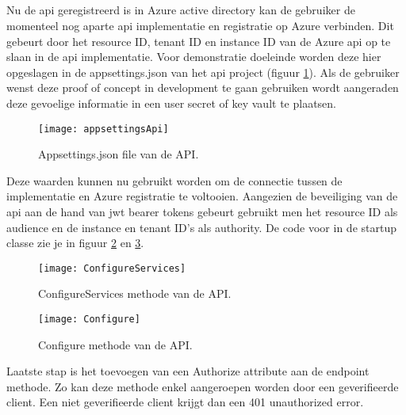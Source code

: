 \subsection{}
Nu de api geregistreerd is in Azure active directory kan de gebruiker de momenteel nog aparte api implementatie en registratie op Azure verbinden. Dit gebeurt door het resource ID, tenant ID en instance ID van de Azure api op te slaan in de api implementatie. Voor demonstratie doeleinde worden deze hier opgeslagen in de appsettings.json van het api project (figuur \ref{fig:appsetAPI}). Als de gebruiker wenst deze proof of concept in development te gaan gebruiken wordt aangeraden deze gevoelige informatie in een user secret of key vault te plaatsen.
\begin{figure}[H]
	\centering
	\texttt{[image: appsettingsApi]} 
	\caption[Appsetingsjosn]{Appsettings.json file van de API.}
	\label{fig:appsetAPI}
\end{figure}
Deze waarden kunnen nu gebruikt worden om de connectie tussen de implementatie en Azure registratie te voltooien. Aangezien de beveiliging van de api aan de hand van jwt bearer tokens gebeurt gebruikt men het resource ID als audience en de instance en tenant ID’s als authority. De code voor in de startup classe zie je in figuur \ref{fig:configureServices} en \ref{fig:configure}. 
\begin{figure}[H]
	\centering
	\texttt{[image: ConfigureServices]} 
	\caption[ConfigureServices]{ConfigureServices methode van de API.}
	\label{fig:configureServices}
\end{figure}\newpage
\begin{figure}[H]
	\centering
	\texttt{[image: Configure]} 
	\caption[Configure]{Configure methode van de API.}
	\label{fig:configure}
\end{figure}
Laatste stap is het toevoegen van een Authorize attribute aan de endpoint methode. Zo kan deze methode enkel aangeroepen worden door een geverifieerde client. Een niet geverifieerde client krijgt dan een 401 unauthorized error.
